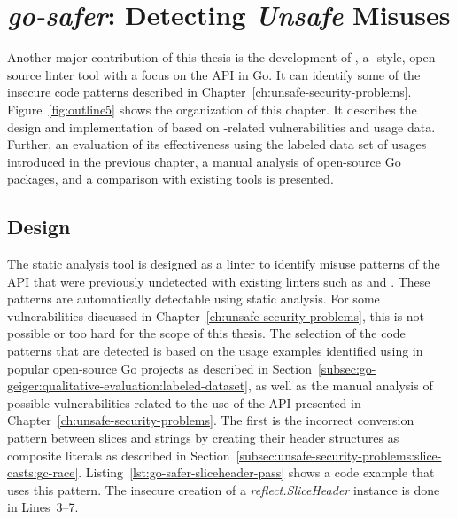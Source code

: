
\chapter{\textit{go-safer}: Detecting \textit{Unsafe} Misuses}\label{ch:go-safer}

Another major contribution of this thesis is the development of \toolSafer{}, a \toolVet{}-style, open-source linter
tool with a focus on the \unsafe{} \acrshort{API} in Go.
It can identify some of the insecure code patterns described in Chapter~\ref{ch:unsafe-security-problems}.
Figure~\ref{fig:outline5} shows the organization of this chapter.
It describes the design and implementation of \toolSafer{} based on \unsafe{}-related vulnerabilities and usage data.
Further, an evaluation of its effectiveness using the labeled data set of \unsafe{} usages introduced in the
previous chapter, a manual analysis of open-source Go packages, and a comparison with existing tools is presented.





\section{Design}\label{sec:go-safer:design}

The \toolSafer{} static analysis tool is designed as a linter to identify  misuse patterns of the
\unsafe{} \acrshort{API} that were previously undetected with existing linters such as \toolVet{} and \toolGosec{}.
These patterns are automatically detectable using static analysis.
For some vulnerabilities discussed in Chapter~\ref{ch:unsafe-security-problems}, this is not possible or too hard for
the scope of this thesis.
The selection of the code patterns that are detected is based on the \unsafe{} usage examples identified using
\toolGeiger{} in popular open-source Go projects as described in
Section~\ref{subsec:go-geiger:qualitative-evaluation:labeled-dataset}, as well as the manual analysis of possible
vulnerabilities related to the use of the \unsafe{} \acrshort{API} presented in
Chapter~\ref{ch:unsafe-security-problems}.
The first is the incorrect conversion pattern between slices and strings by creating their header structures as
composite literals as described in Section~\ref{subsec:unsafe-security-problems:slice-casts:gc-race}.
Listing~\ref{lst:go-safer-sliceheader-pass} shows a code example that uses this pattern.
The insecure creation of a \textit{reflect.SliceHeader} instance is done in Lines~3--7.

